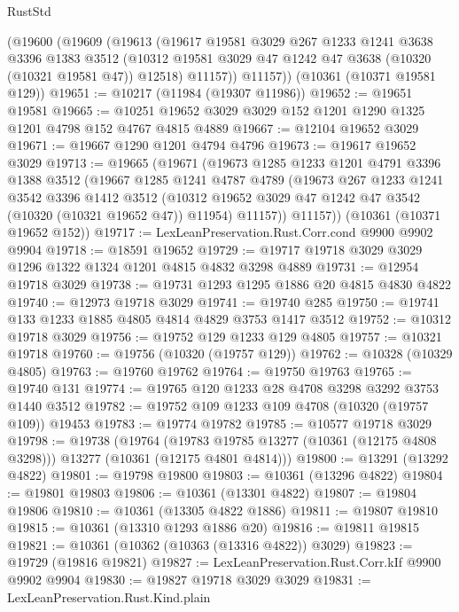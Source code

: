 \begin{lexlean}{RustStd}
\begin{coremodule}
    (@19600
      (@19609
        (@19613
          (@19617
            @19581
            @3029
            @267
            @1233
            @1241
            @3638
            @3396
            @1383
            @3512
            (@10312 @19581 @3029 @47 @1242 @47 @3638 (@10320 (@10321 @19581 @47)) @12518)
            @11157))
        @11157))
    (@10361 (@10371 @19581 @129))
@19651 := @10217 (@11984 (@19307 @11986))
@19652 := @19651 @19581
@19665 := @10251 @19652 @3029 @3029 @152 @1201 @1290 @1325 @1201 @4798 @152 @4767 @4815 @4889
@19667 := @12104 @19652 @3029
@19671 := @19667 @1290 @1201 @4794 @4796
@19673 := @19617 @19652 @3029
@19713 := @19665
    (@19671
      (@19673
        @1285
        @1233
        @1201
        @4791
        @3396
        @1388
        @3512
        (@19667
          @1285
          @1241
          @4787
          @4789
          (@19673
            @267
            @1233
            @1241
            @3542
            @3396
            @1412
            @3512
            (@10312 @19652 @3029 @47 @1242 @47 @3542 (@10320 (@10321 @19652 @47)) @11954)
            @11157))
        @11157))
    (@10361 (@10371 @19652 @152))
@19717 := LexLeanPreservation.Rust.Corr.cond @9900 @9902 @9904
@19718 := @18591 @19652
@19729 := @19717 @19718 @3029 @3029 @1296 @1322 @1324 @1201 @4815 @4832 @3298 @4889
@19731 := @12954 @19718 @3029
@19738 := @19731 @1293 @1295 @1886 @20 @4815 @4830 @4822
@19740 := @12973 @19718 @3029
@19741 := @19740 @285
@19750 := @19741 @133 @1233 @1885 @4805 @4814 @4829 @3753 @1417 @3512
@19752 := @10312 @19718 @3029
@19756 := @19752 @129 @1233 @129 @4805
@19757 := @10321 @19718
@19760 := @19756 (@10320 (@19757 @129))
@19762 := @10328 (@10329 @4805)
@19763 := @19760 @19762
@19764 := @19750 @19763
@19765 := @19740 @131
@19774 := @19765 @120 @1233 @28 @4708 @3298 @3292 @3753 @1440 @3512
@19782 := @19752 @109 @1233 @109 @4708 (@10320 (@19757 @109)) @19453
@19783 := @19774 @19782
@19785 := @10577 @19718 @3029
@19798 := @19738
    (@19764
      (@19783 @19785 @13277 (@10361 (@12175 @4808 @3298)))
      @13277
      (@10361 (@12175 @4801 @4814)))
@19800 := @13291 (@13292 @4822)
@19801 := @19798 @19800
@19803 := @10361 (@13296 @4822)
@19804 := @19801 @19803
@19806 := @10361 (@13301 @4822)
@19807 := @19804 @19806
@19810 := @10361 (@13305 @4822 @1886)
@19811 := @19807 @19810
@19815 := @10361 (@13310 @1293 @1886 @20)
@19816 := @19811 @19815
@19821 := @10361 (@10362 (@10363 (@13316 @4822)) @3029)
@19823 := @19729 (@19816 @19821)
@19827 := LexLeanPreservation.Rust.Corr.kIf @9900 @9902 @9904
@19830 := @19827 @19718 @3029 @3029
@19831 := LexLeanPreservation.Rust.Kind.plain

\end{coremodule}
\end{lexlean}
